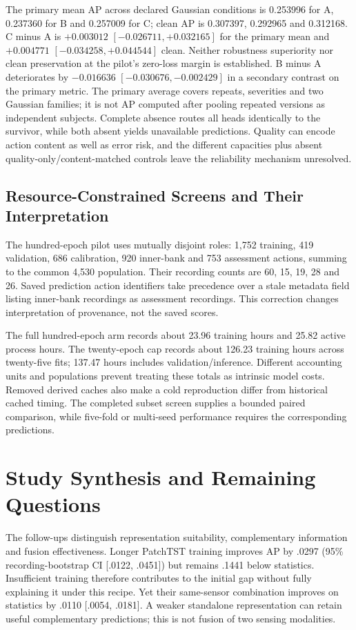 The primary mean AP across declared Gaussian conditions is 0.253996 for A, 0.237360 for
B and 0.257009 for C; clean AP is 0.307397, 0.292965 and 0.312168. C minus A is
$+0.003012$ $[-0.026711,+0.032165]$ for the primary mean and $+0.004771$
$[-0.034258,+0.044544]$ clean. Neither robustness superiority nor clean preservation at
the pilot's zero-loss margin is established. B minus A deteriorates by $-0.016636$
$[-0.030676,-0.002429]$ in a secondary contrast on the primary metric. The primary
average covers repeats, severities and two Gaussian families; it is not AP computed
after pooling repeated versions as independent subjects. Complete absence routes all
heads identically to the survivor, while both absent yields unavailable predictions.
Quality can encode action content as well as error risk, and the different capacities
plus absent quality-only/content-matched controls leave the reliability mechanism
unresolved.

\subsection{Resource-Constrained Screens and Their Interpretation}
The hundred-epoch pilot uses mutually disjoint roles: 1,752 training, 419 validation,
686 calibration, 920 inner-bank and 753 assessment actions, summing to the common 4,530
population. Their recording counts are 60, 15, 19, 28 and 26. Saved prediction action
identifiers take precedence over a stale metadata field listing inner-bank recordings as
assessment recordings. This correction changes interpretation of provenance, not the
saved scores.

The full hundred-epoch arm records about 23.96 training hours and 25.82 active process
hours. The twenty-epoch cap records about 126.23 training hours across twenty-five fits;
137.47 hours includes validation/inference. Different accounting units and populations
prevent treating these totals as intrinsic model costs. Removed derived caches also make
a cold reproduction differ from historical cached timing. The completed subset screen
supplies a bounded paired comparison, while five-fold or multi-seed performance requires
the corresponding predictions.

\section{Study Synthesis and Remaining Questions}
The follow-ups distinguish representation suitability, complementary information and
fusion effectiveness. Longer PatchTST training improves AP by .0297 (95\%
recording-bootstrap CI [.0122, .0451]) but remains .1441 below statistics. Insufficient
training therefore contributes to the initial gap without fully explaining it under this
recipe. Yet their same-sensor combination improves on statistics by .0110 [.0054,
.0181]. A weaker standalone representation can retain useful complementary predictions;
this is not fusion of two sensing modalities.

